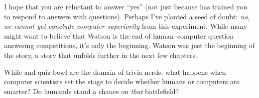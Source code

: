 I hope that you are reluctant to answer ``yes'' (not just
because \jeopardy{} has trained you to respond to answers with
questions).
%
Perhaps I've planted a seed of doubt: \emph{no, we cannot yet conclude
  computer superiority} from this experiment.
%
While many might want to believe that Watson is the end of
human--computer question answering competitions, it's only the
beginning.
%
Watson was just the beginning of the story, a story that unfolds
further in the next few chapters.

While \jeopardy{} and quiz bowl are the domain of trivia nerds, what
happens when computer scientists set the stage to decide whether
humans or computers are smarter?
%
Do humands stand a chance on \emph{that} battlefield?
